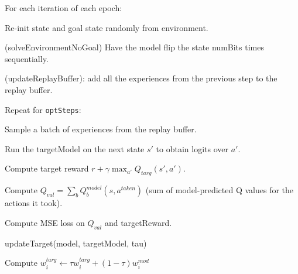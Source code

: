 \documentclass[11pt]{article}
\begin{document}
\begin{algorithm}[flipBits]
	
	For each iteration of each epoch:
	\begin{compactenum}
		\item Re-init state and goal state randomly from environment. 
		
		\item (solveEnvironmentNoGoal) Have the model flip the state numBits times sequentially. 
		
		\item  (updateReplayBuffer): add all the experiences from the previous step to the replay buffer. 
		
		\item Repeat for \texttt{optSteps}:
		\begin{compactenum}
			\item Sample a batch of experiences from the replay buffer. 
			\item Run the targetModel on the next state $s'$ to obtain logits over $a'$. 
			\item Compute target reward $r + \gamma \max_{a'} Q_{targ}(s', a')$. 
			\item Compute $Q_{val} = \sum_b Q^{model}_b(s, a^{taken})$ (sum of model-predicted Q values for the actions it took). 
			\item Compute MSE loss on $Q_{val}$ and targetReward.
		\end{compactenum}
	\end{compactenum}
\end{algorithm}

\begin{compactitem}
	\item updateTarget(model, targetModel, tau)
	\begin{compactenum}
		\item Compute $w_i^{targ} \leftarrow \tau w_i^{targ} + (1 - \tau) w_i^{mod}$
	\end{compactenum}
\end{compactitem}


\begin{compactitem}
	
	
	
\end{compactitem}
\end{document}
